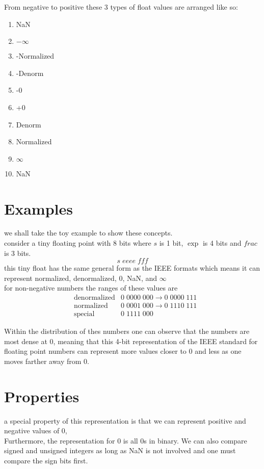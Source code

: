 \documentclass[12pt]{book}
\begin{document}
From negative to positive these 3 types of float values are arranged like so:
\begin{enumerate}
        \item NaN
        \item $-\infty$
        \item -Normalized
        \item -Denorm
        \item -0
        \item +0
        \item Denorm
        \item Normalized
        \item $\infty$
        \item NaN
\end{enumerate}


\section*{Examples}
we shall take the toy example to show these concepts.\\
consider a tiny floating point with 8 bits where $s$ is 1 bit,  $\exp$ is 4 bits and $frac$ is 3 bits.
\[s\;eeee\;fff\]
this tiny float has the same general form as the IEEE formats which means it can represent normalized,
denormalized, 0, NaN, and $\infty$\\
for non-negative numbers the ranges of these values are
\begin{align*}
        &\text{denormalized}    &0\;0000\;000\rightarrow 0\;0000\;111\\
        &\text{normalized}  &0\;0001\;000\rightarrow 0\;1110\;111\\
        &\text{special} &0\;1111\;000
\end{align*}

Within the distribution of thes numbers one can observe that the numbers are most dense at 0, 
        meaning that this 4-bit representation of the IEEE standard for floating point numbers can 
        represent more values closer to 0 and less as one moves farther away from 0.


\section*{Properties}
a special property of this representation is that we can represent positive and negative values of 0,\\
Furthermore, the representation for 0 is all 0s in binary.
We can also compare signed and unsigned integers as long as NaN is not involved and one must compare the
        sign bits first.
\end{document}

